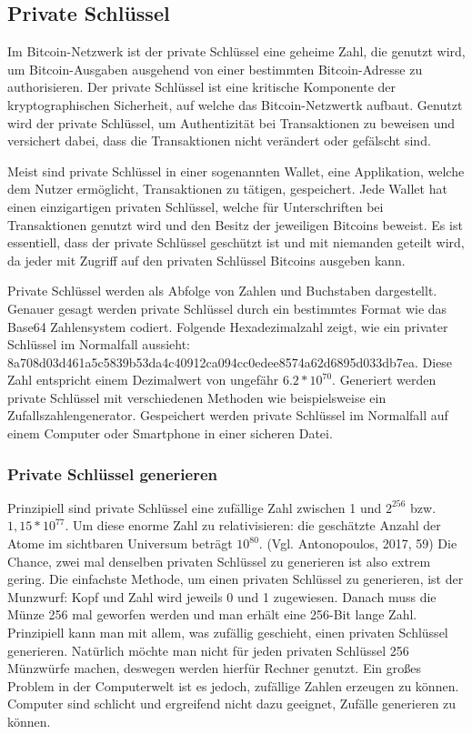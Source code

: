 \subsection{Private Schlüssel}
Im Bitcoin-Netzwerk ist der private Schlüssel eine geheime Zahl, die genutzt wird, um Bitcoin-Ausgaben ausgehend von einer 
bestimmten Bitcoin-Adresse zu authorisieren. Der private Schlüssel ist eine kritische Komponente der kryptographischen Sicherheit,
auf welche das Bitcoin-Netzwertk aufbaut. Genutzt wird der private Schlüssel, um Authentizität bei Transaktionen zu beweisen und
versichert dabei, dass die Transaktionen nicht verändert oder gefälscht sind.

Meist sind private Schlüssel in einer sogenannten Wallet, eine Applikation, welche dem Nutzer ermöglicht, Transaktionen zu tätigen,
gespeichert. Jede Wallet hat einen einzigartigen privaten Schlüssel, welche für Unterschriften bei Transaktionen genutzt wird und
den Besitz der jeweiligen Bitcoins beweist. Es ist essentiell, dass der private Schlüssel geschützt ist und mit niemanden geteilt
wird, da jeder mit Zugriff auf den privaten Schlüssel Bitcoins ausgeben kann.

Private Schlüssel werden als Abfolge von Zahlen und Buchstaben dargestellt. Genauer gesagt werden private Schlüssel durch ein
bestimmtes Format wie das Base64 Zahlensystem codiert. Folgende Hexadezimalzahl zeigt, wie ein privater Schlüssel im 
Normalfall aussieht: 8a708d03d461a5c5839b53da4c40912ca094cc0edee8574a62d6895d033db7ea. Diese Zahl entspricht einem Dezimalwert 
von ungefähr \( 6.2 * 10^{70} \). Generiert werden private Schlüssel mit verschiedenen Methoden wie beispielsweise ein 
Zufallszahlengenerator. Gespeichert werden private Schlüssel im Normalfall auf einem Computer oder Smartphone in einer sicheren 
Datei.

\subsubsection{Private Schlüssel generieren}
Prinzipiell sind private Schlüssel eine zufällige Zahl zwischen 1 und \( 2^{256} \) bzw. \( 1,15 * 10^{77} \). Um diese enorme Zahl
zu relativisieren: die geschätzte Anzahl der Atome im sichtbaren Universum beträgt \( 10^{80} \). (Vgl. Antonopoulos, 2017, 59) Die Chance,
zwei mal denselben privaten Schlüssel zu generieren ist also extrem gering. Die einfachste Methode, um einen privaten Schlüssel
zu generieren, ist der Munzwurf: Kopf und Zahl wird jeweils 0 und 1 zugewiesen. Danach muss die Münze 256 mal geworfen werden
und man erhält eine 256-Bit lange Zahl. Prinzipiell kann man mit allem, was zufällig geschieht, einen privaten Schlüssel generieren.
Natürlich möchte man nicht für jeden privaten Schlüssel 256 Münzwürfe machen, deswegen werden hierfür Rechner genutzt. Ein großes
Problem in der Computerwelt ist es jedoch, zufällige Zahlen erzeugen zu können. Computer sind schlicht und ergreifend nicht dazu 
geeignet, Zufälle generieren zu können.

